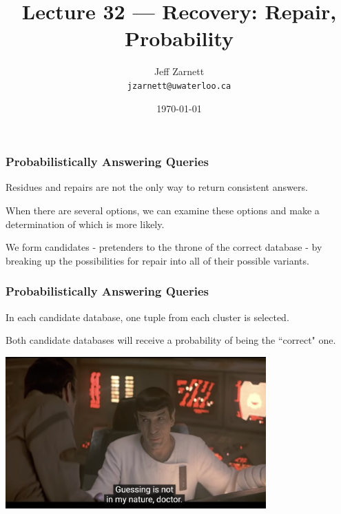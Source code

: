 

\title{Lecture 32 --- Recovery: Repair, Probability }

\author{Jeff Zarnett \\ \small \texttt{jzarnett@uwaterloo.ca}}
\date{\today}




\begin{frame}
  \titlepage

 \end{frame}

\begin{frame}
\frametitle{Probabilistically Answering Queries}

Residues and repairs are not the only way to return consistent answers. 

When there are several options, we can examine these options and make a determination of which is more likely. 

We form candidates - pretenders to the throne of the correct database -  by breaking up the possibilities for repair into all of their possible variants. 

 \end{frame}

\begin{frame}
\frametitle{Probabilistically Answering Queries}



In each candidate database, one tuple from each cluster is selected. 

Both candidate databases will receive a probability of being the ``correct" one.

\begin{center}
	\includegraphics[width=0.75\textwidth]{images/guessing.png}
\end{center}

\end{frame}


